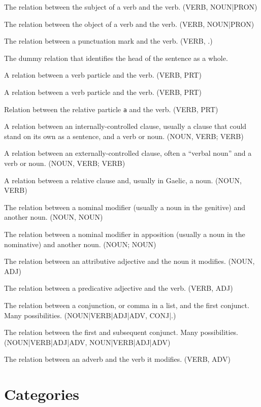 \documentclass[a4paper]{article}
\begin{document}
 The relation between the subject of a verb and the verb. (VERB, NOUN|PRON)

 The relation between the object of a verb and the verb. (VERB, NOUN|PRON)

 The relation between a punctuation mark and the verb. (VERB, .)

 The dummy relation that identifies the head of the sentence as a whole.

 A relation between a verb particle and the verb. (VERB, PRT)

 A relation between a verb particle and the verb. (VERB, PRT)

 Relation between the relative particle \texttt{a} and the verb. (VERB, PRT)

 A relation between an internally-controlled clause, usually a clause that could stand on its own as a sentence, and a verb or noun. (NOUN, VERB; VERB)

 A relation between an externally-controlled clause, often a ``verbal noun'' and a verb or noun. (NOUN, VERB; VERB)

 A relation between a relative clause and, usually in Gaelic, a noun. (NOUN, VERB)

 The relation between a nominal modifier (usually a noun in the genitive) and another noun. (NOUN, NOUN)

 The relation between a nominal modifier in apposition (usually a noun in the nominative) and another noun. (NOUN; NOUN)

 The relation between an attributive adjective and the noun it modifies. (NOUN, ADJ)

 The relation between a predicative adjective and the verb. (VERB, ADJ)

 The relation between a conjunction, or comma in a list, and the first conjunct. Many possibilities. (NOUN|VERB|ADJ|ADV, CONJ|.)

 The relation between the first and subsequent conjunct. Many possibilities. (NOUN|VERB|ADJ|ADV, NOUN|VERB|ADJ|ADV)

 The relation between an adverb and the verb it modifies. (VERB, ADV)

\section{Categories}
\end{document}
